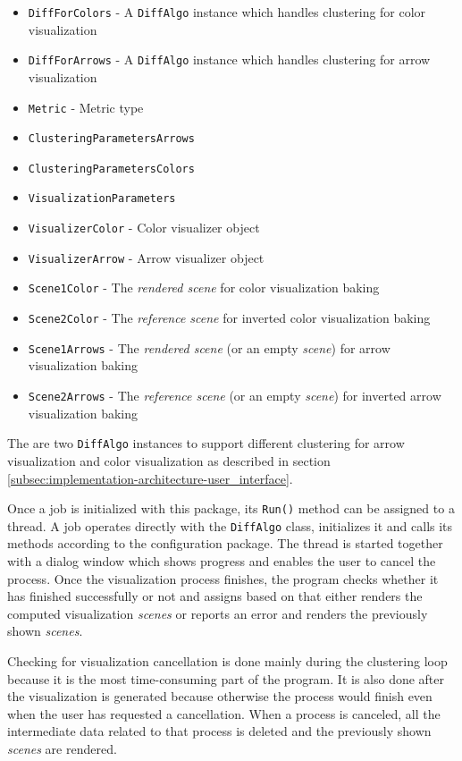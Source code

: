 \begin{itemize}
\item \verb+DiffForColors+ - A \verb+DiffAlgo+ instance which handles clustering for color visualization
\item \verb+DiffForArrows+ - A \verb+DiffAlgo+ instance which handles clustering for arrow visualization
\item \verb+Metric+ - Metric type
\item \verb+ClusteringParametersArrows+
\item \verb+ClusteringParametersColors+
\item \verb+VisualizationParameters+
\item \verb+VisualizerColor+ - Color visualizer object
\item \verb+VisualizerArrow+ - Arrow visualizer object
\item \verb+Scene1Color+ - The {\it rendered scene} for color visualization baking
\item \verb+Scene2Color+ - The {\it reference scene} for inverted color visualization baking
\item \verb+Scene1Arrows+ - The {\it rendered scene} (or an empty {\it scene}) for arrow visualization baking
\item \verb+Scene2Arrows+ - The {\it reference scene} (or an empty {\it scene}) for inverted arrow visualization baking
\end{itemize}

The are two \verb+DiffAlgo+ instances to support different clustering for arrow visualization and color visualization as described in section \ref{subsec:implementation-architecture-user_interface}.

Once a job is initialized with this package, its \verb+Run()+ method can be assigned to a thread. A job operates directly with the \verb+DiffAlgo+ class, initializes it and calls its methods according to the configuration package. The thread is started together with a dialog window which shows progress and enables the user to cancel the process. Once the visualization process finishes, the program checks whether it has finished successfully or not and assigns based on that either renders the computed visualization {\it scenes} or reports an error and renders the previously shown {\it scenes}.

Checking for visualization cancellation is done mainly during the clustering loop because it is the most time-consuming part of the program. It is also done after the visualization is generated because otherwise the process would finish even when the user has requested a cancellation. When a process is canceled, all the intermediate data related to that process is deleted and the previously shown {\it scenes} are rendered.